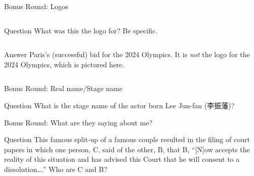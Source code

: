 \documentclass[11pt]{beamer}
\begin{document}
\begin{frame}[t]{Bonus Round: Logos}
\begin{columns}[T,totalwidth=\linewidth]
\begin{column}{0.47\linewidth}
\begin{block}{Question}
What was this the logo for? Be specific.
\end{block}
\end{column}
\begin{column}{0.47\linewidth}
\texttt{[image: \{Images/paris2024bid]}.png}
\end{column}
\end{columns}
\vspace{1em}
\pause{}
\begin{columns}[T,totalwidth=\linewidth]
\begin{column}{0.47\linewidth}
\begin{block}{Answer}
Paris's (successful) bid for the 2024 Olympics. It is \emph{not} the logo for the 2024 Olympics, which is pictured here.
\end{block}
\end{column}
\begin{column}{0.47\linewidth}
\texttt{[image: \{Images/paris2024official]}.png}
\end{column}
\end{columns}
\end{frame}
\begin{frame}[t]{Bonus Round: Real name/Stage name}
\begin{block}{Question}
What is the stage name of the actor born Lee Jun-fan (李振藩)?
\end{block}
\end{frame}
\begin{frame}[t]{Bonus Round: What are they saying about me?}
\begin{block}{Question}
This famous split-up of a famous couple resulted in the filing of court papers in which one person, C\textunderscore{}\textunderscore{}\textunderscore{}\textunderscore{}\textunderscore{}, said of the other, B\textunderscore{}\textunderscore{}\textunderscore{}\textunderscore{}\textunderscore{}, that B\textunderscore{}\textunderscore{}\textunderscore{}\textunderscore{}\textunderscore{}, ``[N]ow accepts the reality of this situation and has advised this Court that he will consent to a dissolution\ldots{}.'' Who are C\textunderscore{}\textunderscore{}\textunderscore{}\textunderscore{}\textunderscore{} and B\textunderscore{}\textunderscore{}\textunderscore{}\textunderscore{}\textunderscore{}?
\end{block}
\end{frame}
\end{document}
